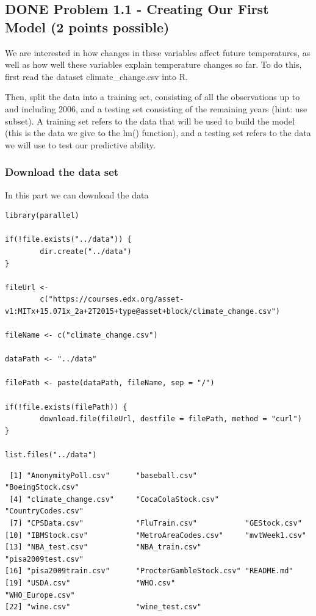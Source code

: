 \documentclass[letterpaper, 9pt, onecolumn, twoside, technote, final]{IEEEtran}
\begin{document}
\subsection{{\bfseries\sffamily DONE} Problem 1.1 - Creating Our First Model (2 points possible)}
\label{sec-1-1}
We are interested in how changes in these variables affect future
temperatures, as well as how well these variables explain temperature
changes so far. To do this, first read the dataset climate\_change.csv
into R.

Then, split the data into a training set, consisting of all the
observations up to and including 2006, and a testing set consisting of
the remaining years (hint: use subset). A training set refers to the
data that will be used to build the model (this is the data we give to
the lm() function), and a testing set refers to the data we will use
to test our predictive ability.

\subsubsection{Download the data set}
\label{sec-1-1-1}

In this part we can download the data

\begin{verbatim}
library(parallel)

if(!file.exists("../data")) {
        dir.create("../data")
}

fileUrl <-
        c("https://courses.edx.org/asset-v1:MITx+15.071x_2a+2T2015+type@asset+block/climate_change.csv")

fileName <- c("climate_change.csv")

dataPath <- "../data"

filePath <- paste(dataPath, fileName, sep = "/")

if(!file.exists(filePath)) {
        download.file(fileUrl, destfile = filePath, method = "curl")
}

list.files("../data")
\end{verbatim}

\begin{verbatim}
 [1] "AnonymityPoll.csv"      "baseball.csv"           "BoeingStock.csv"
 [4] "climate_change.csv"     "CocaColaStock.csv"      "CountryCodes.csv"
 [7] "CPSData.csv"            "FluTrain.csv"           "GEStock.csv"
[10] "IBMStock.csv"           "MetroAreaCodes.csv"     "mvtWeek1.csv"
[13] "NBA_test.csv"           "NBA_train.csv"          "pisa2009test.csv"
[16] "pisa2009train.csv"      "ProcterGambleStock.csv" "README.md"
[19] "USDA.csv"               "WHO.csv"                "WHO_Europe.csv"
[22] "wine.csv"               "wine_test.csv"
\end{verbatim}
\end{document}
